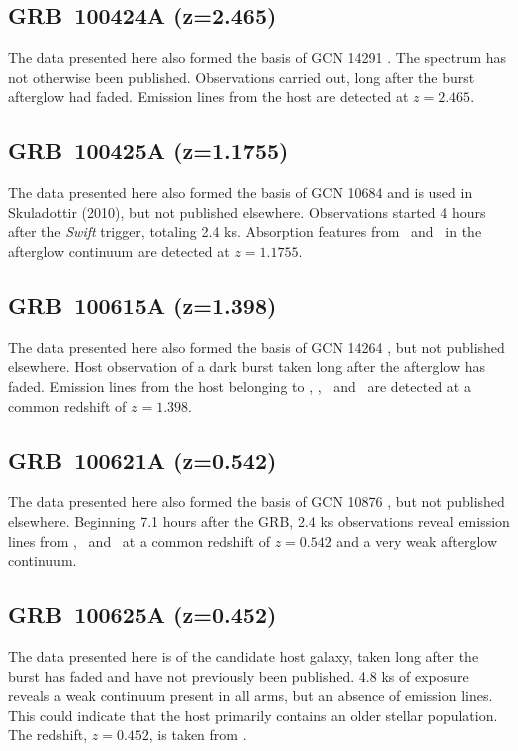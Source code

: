 \documentclass{aa}    %
\begin{document}
\subsection{GRB~100424A (z=2.465)} \label{100424}

The data presented here also formed the basis of GCN 
14291 \citep{GCN14291}. The spectrum has
not otherwise been published. Observations carried out, long after the burst
afterglow had faded.  Emission lines from the host are detected at $z=2.465$.

\subsection{GRB~100425A (z=1.1755)} \label{100425}

The data presented here also formed the basis of GCN 
10684 \citep{GCN10684} and is used in
Skuladottir (2010), but not published elsewhere. Observations started 4 hours
after the \textit{Swift} trigger, totaling 2.4 ks. Absorption features from
\mgii~and \feii~in the afterglow continuum are detected at $z=1.1755$.

\subsection{GRB~100615A (z=1.398)} \label{100615}

The data presented here also formed the basis of GCN 
14264 \citep{GCN14264}, but not
published elsewhere. Host observation of a dark burst \citep{DElia2011} taken
long after the afterglow has faded. Emission lines from the host belonging to
\oii, \neiii, \oiii~and \ha~are detected at a common redshift of $z=1.398$.

\subsection{GRB~100621A (z=0.542)} \label{100621}

The data presented here also formed the basis of GCN 
10876 \citep{GCN10876}, but not
published elsewhere. Beginning 7.1 hours after the GRB, 2.4 ks observations
reveal emission lines from \oii, \hb~and \oiii~at a common redshift of $z=0.542$
and a very weak afterglow continuum.

\subsection{GRB~100625A (z=0.452)} \label{100625}

The data presented here is of the candidate host galaxy, taken long after the
burst has faded and have not previously been published. 4.8 ks of exposure
reveals a weak continuum present in all arms, but an absence of emission lines.
This could indicate that the host primarily contains an older stellar
population. The redshift, $z=0.452$, is taken from \citet{Fong2013}.
\end{document}
